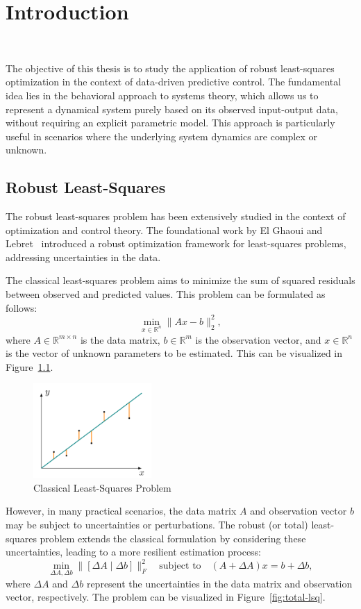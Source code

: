 \chapter{Introduction}~\label{ch:Introduction}

The objective of this thesis is to study the application of robust least-squares optimization in the context of data-driven predictive control. The fundamental idea lies in the behavioral approach to systems theory, which allows us to represent a dynamical system purely based on its observed input-output data, without requiring an explicit parametric model. This approach is particularly useful in scenarios where the underlying system dynamics are complex or unknown.

\section{Robust Least-Squares}
The robust least-squares problem has been extensively studied in the context of optimization and control theory. The foundational work by El Ghaoui and Lebret~\cite{ghaoui97} introduced a robust optimization framework for least-squares problems, addressing uncertainties in the data.

The classical least-squares problem aims to minimize the sum of squared residuals between observed and predicted values. This problem can be formulated as follows:
\[\min_{x \in \mathbb{R}^n} \|Ax - b\|_2^2,\]
where \(A \in \mathbb{R}^{m \times n}\) is the data matrix, \(b \in \mathbb{R}^m\) is the observation vector, and \(x \in \mathbb{R}^n\) is the vector of unknown parameters to be estimated. This can be visualized in Figure~\ref{fig:lsq}.
\begin{figure}[h]
    \centering
    \includegraphics[width=0.4\textwidth]{figures/lsq.png}
    \caption{Classical Least-Squares Problem}
    \label{fig:lsq}
\end{figure}

However, in many practical scenarios, the data matrix \(A\) and observation vector \(b\) may be subject to uncertainties or perturbations. The robust (or total) least-squares problem extends the classical formulation by considering these uncertainties, leading to a more resilient estimation process:
\[\min_{\Delta A, \Delta b} \|[\Delta A \mid \Delta b]\|^2_F \quad \text{subject to} \quad (A + \Delta A)x = b + \Delta b,
\]
where \(\Delta A\) and \(\Delta b\) represent the uncertainties in the data matrix and observation vector, respectively. The problem can be visualized in Figure~\ref{fig:total-lsq}. 

